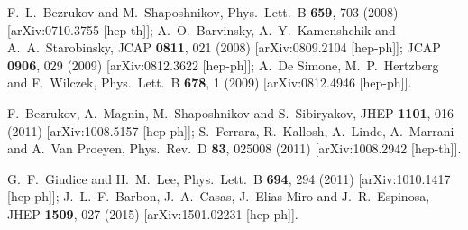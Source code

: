 \documentclass[aps,prd,preprint,superscriptaddress,showpacs,ctexart]{revtex4-1}
\begin{document}
\begin{thebibliography}{10}
 F.~L.~Bezrukov and M.~Shaposhnikov,
 Phys.\ Lett.\ B \textbf{659}, 703 (2008)
{[}arXiv:0710.3755 {[}hep-th{]}{]}; %
%
 A.~O.~Barvinsky, A.~Y.~Kamenshchik
and A.~A.~Starobinsky, %
 JCAP \textbf{0811}, 021 (2008) %
 {[}arXiv:0809.2104 {[}hep-ph{]}{]}; %
%
 JCAP \textbf{0906}, 029 (2009)
 {[}arXiv:0812.3622 {[}hep-ph{]}{]}; %
%
 A.~De Simone, M.~P.~Hertzberg and F.~Wilczek,
 Phys.\ Lett.\ B \textbf{678}, 1 (2009) %
 {[}arXiv:0812.4946 {[}hep-ph{]}{]}. %






 F.~Bezrukov, A.~Magnin, M.~Shaposhnikov
and S.~Sibiryakov, %
 JHEP \textbf{1101}, 016 (2011) %
 {[}arXiv:1008.5157 {[}hep-ph{]}{]}; %
 S.~Ferrara, R.~Kallosh, A.~Linde, A.~Marrani and A.~Van Proeyen,
 Phys.\ Rev.\ D \textbf{83}, 025008 (2011) %
 {[}arXiv:1008.2942 {[}hep-th{]}{]}. %


 G.~F.~Giudice and H.~M.~Lee, %
 Phys.\ Lett.\ B \textbf{694}, 294 (2011) %
 {[}arXiv:1010.1417 {[}hep-ph{]}{]}; %
 J.~L.~F.~Barbon, J.~A.~Casas, J.~Elias-Miro and J.~R.~Espinosa,
 JHEP \textbf{1509}, 027 (2015) %
 {[}arXiv:1501.02231 {[}hep-ph{]}{]}. %


\end{thebibliography}
\end{document}
